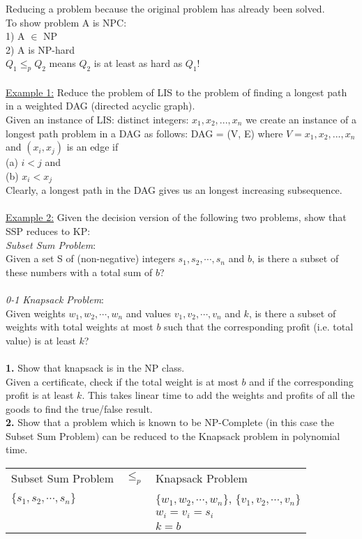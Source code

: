 \documentclass[8pt,letterpaper,twocolumn]{article}
\begin{document}
Reducing a problem because the original problem has already been solved.\\
To show problem A is NPC:\\
1) A $\in$ NP\\
2) A is NP-hard\\
$Q_1 \leq_p Q_2$ means $Q_2$ is at least as hard as $Q_1$!\\
\\
\underline{Example 1:} Reduce the problem of LIS to the problem of finding a longest path in a weighted DAG (directed acyclic graph).\\
Given an instance of LIS: distinct integers: $x_1,x_2,...,x_n$ we create an instance of a longest path problem in a DAG as follows:
DAG = (V, E) where $V = {x_1,x_2,...,x_n}$ and $(x_i, x_j)$ is an edge if\\
(a) $i < j$ and\\
(b) $x_i < x_j$\\
Clearly, a longest path in the DAG gives us an longest increasing subsequence.\\
\\
\underline{Example 2:} Given the decision version of the following two problems, show that SSP reduces to KP:\\
\emph{Subset Sum Problem}:\\
Given a set S of (non-negative) integers $s_1,s_2,\cdots,s_n$ and $b$, is there a subset of these numbers with a total sum of $b$?\\ \\
\emph{0-1 Knapsack Problem}:\\
Given weights $w_1,w_2,\cdots,w_n$ and values $v_1,v_2,\cdots,v_n$ and $k$, is there a subset of weights with total weights at most $b$ such that the corresponding
profit (i.e. total value) is at least $k$?\\
\\
\textbf{1.} Show that knapsack is in the NP class.\\
Given a certificate, check if the total weight is at most $b$ and if the corresponding profit is at least $k$.
This takes linear time to add the weights and profits of all the goods to find the true/false result.\\
\textbf{2.} Show that a problem which is known to be NP-Complete (in this case the Subset Sum Problem) can be reduced to the Knapsack problem in polynomial time.\\
\begin{tabular}{ l c l }\\
Subset Sum Problem & $\leq_p$ & Knapsack Problem\\
$\{s_1,s_2,\cdots,s_n\}$ & & $\{w_1,w_2,\cdots,w_n\}$, $\{v_1,v_2,\cdots,v_n\}$\\
& & $w_i=v_i=s_i$\\
& & $k=b$\\
\end{tabular}\\
\end{document}
